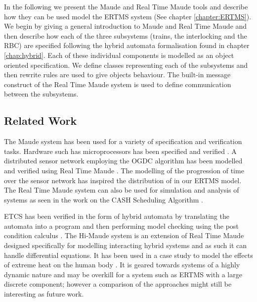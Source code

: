 \newcommand{\rtmaude}{Real Time Maude}

\label{chap:modelertms}
In the following we present the Maude \cite{MC03,Maude} and Real Time Maude \cite{PO02,PO04,RTMaude} tools and describe how they can be used model the ERTMS system (See chapter \ref{chapter:ERTMS}).   We begin by giving a general introduction to Maude and Real Time Maude and then describe how each of the three subsystems (trains, the interlocking and the RBC) are specified following the hybrid automata formalisation found in chapter \ref{chap:hybrid}. Each of these individual components is modelled as an object oriented specification. We define classes representing each of the subsystems and then rewrite rules are used to give objects behaviour. The  built-in message construct of the Real Time Maude system is used to define communication between the subsystems. 

\subsection*{Related Work}
The Maude system has been used for a variety of specification and verification tasks. Hardware such has microprocessors has been specified and verified \cite{NH00}. A distributed sensor network employing the OGDC algorithm has been modelled and verified using Real Time Maude \cite{PO07}. The modelling of the progression of time over the sensor network has inspired the distribution of in our ERTMS model. The Real Time Maude system can also be used for simulation and analysis of systems as seen in the work on the CASH Scheduling Algorithm \cite{PO06}. 

ETCS has been verified in the form of hybrid automata by translating the automata into a program and then performing model checking using the post condition calculus \cite{DI13}. The Hi-Maude system \cite{MF11} is an extension of Real Time Maude designed specifically for modelling interacting hybrid systems and as such it can handle differential equations. It has been used in a case study to model the effects of extreme heat on the human body \cite{MF12}. It is geared towards systems of a highly dynamic nature and may be overkill for a system such as ERTMS with a large discrete component; however a comparison of the approaches might still be interesting as future work.


